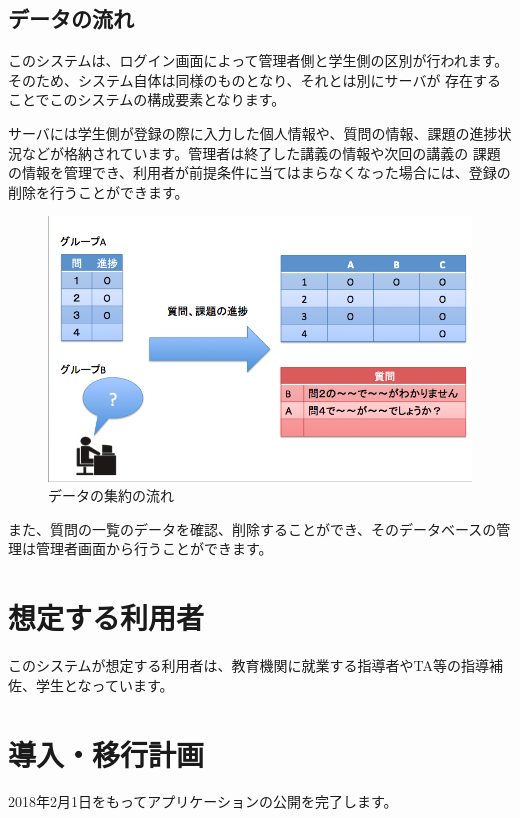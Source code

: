 \documentclass[a4j,titlepage]{ujarticle}
\begin{document}
\subsection{データの流れ}
このシステムは、ログイン画面によって管理者側と学生側の区別が行われます。そのため、システム自体は同様のものとなり、それとは別にサーバが %
存在することでこのシステムの構成要素となります。

サーバには学生側が登録の際に入力した個人情報や、質問の情報、課題の進捗状況などが格納されています。管理者は終了した講義の情報や次回の講義の
課題の情報を管理でき、利用者が前提条件に当てはまらなくなった場合には、登録の削除を行うことができます。
\begin{figure}[h]

\centering
   \includegraphics[width=13cm]{ui.png}
  \caption{データの集約の流れ}
\end{figure}

また、質問の一覧のデータを確認、削除することができ、そのデータベースの管理は管理者画面から行うことができます。

\section{想定する利用者}
このシステムが想定する利用者は、教育機関に就業する指導者やTA等の指導補佐、学生となっています。 %

\section{導入・移行計画}
2018年2月1日をもってアプリケーションの公開を完了します。
\end{document}
